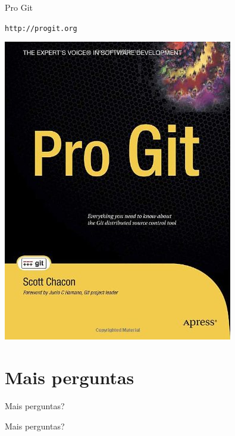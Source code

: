 \documentclass[portuguese,brazil]{beamer}
\newcommand\singlephrase[1]{
  \begin{center}
    \huge #1
  \end{center}
}
\begin{document}
\begin{frame}{Pro Git}
\begin{center}
\texttt{http://progit.org}
\end{center}
\begin{center}
  \includegraphics[scale=.3]{images/progit.jpg}
\end{center}
\end{frame}

\section*{Mais perguntas}

\begin{frame}{Mais perguntas?}
  \singlephrase{Mais perguntas?}
\end{frame}
\end{document}
